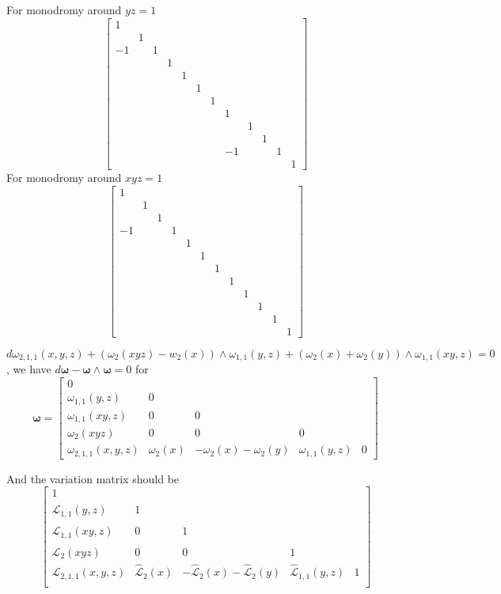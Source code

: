 \documentclass[main]{subfiles}
\begin{document}
For monodromy around $yz=1$
\[\begin{bmatrix}
1\\
&1\\
-1&&1\\
&&&1\\
&&&&1\\
&&&&&1\\
&&&&&&1\\
&&&&&&&1\\
&&&&&&&&1\\
&&&&&&&&&1\\
&&&&&&&-1&&&1\\
&&&&&&&&&&&1
\end{bmatrix}\]
For monodromy around $xyz=1$
\[\begin{bmatrix}
1\\
&1\\
&&1\\
-1&&&1\\
&&&&1\\
&&&&&1\\
&&&&&&1\\
&&&&&&&1\\
&&&&&&&&1\\
&&&&&&&&&1\\
&&&&&&&&&&1\\
&&&&&&&&&&&1
\end{bmatrix}\]

$d\omega_{2,1,1}(x,y,z)+(\omega_2(xyz)-w_2(x))\wedge\omega_{1,1}(y,z)+(\omega_2(x)+\omega_2(y))\wedge\omega_{1,1}(xy,z)=0$, we have $d\bm{\omega}-\bm{\omega}\wedge\bm{\omega}=0$ for
\[\bm{\omega}=\begin{bmatrix}
0\\
\omega_{1,1}(y,z)&0\\
\omega_{1,1}(xy,z)&0&0\\
\omega_{2}(xyz)&0&0&0\\
\omega_{2,1,1}(x,y,z)&\omega_2(x)&-\omega_2(x)-\omega_2(y)&\omega_{1,1}(y,z)&0
\end{bmatrix}\]

And the variation matrix should be
\[
\begin{bmatrix}
1\\
\widehat{\mathcal L}_{1,1}(y,z)&1\\
\widehat{\mathcal L}_{1,1}(xy,z)&0&1\\
\widehat{\mathcal L}_{2}(xyz)&0&0&1\\
\widehat{\mathcal L}_{2,1,1}(x,y,z)&\widehat{\mathcal L}_2(x)&-\widehat{\mathcal L}_2(x)-\widehat{\mathcal L}_2(y)&\widehat{\mathcal L}_{1,1}(y,z)&1\\
\end{bmatrix}
\]
\end{document}
